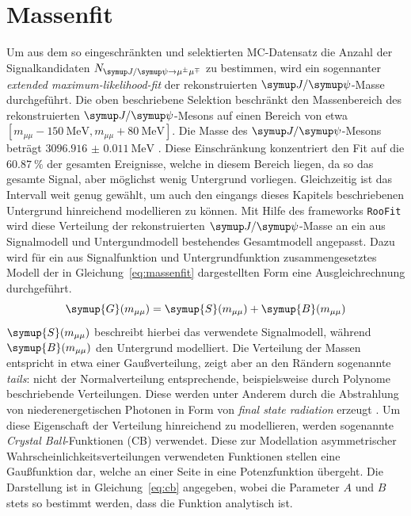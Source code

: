 \section{Massenfit}
Um aus dem so eingeschränkten und selektierten MC-Datensatz die Anzahl der Signalkandidaten $N_{\kontroll}$ zu bestimmen, wird ein sogennanter \textit{extended maximum-likelihood-fit} \cite{extended} der rekonstruierten $\jpsi$-Masse durchgeführt. Die oben
beschriebene Selektion beschränkt den Massenbereich des rekonstruierten $\jpsi$-Mesons auf einen Bereich von etwa
$[m_{\mu\mu}-\SI{150}{\mega\electronvolt}, m_{\mu\mu}+\SI{80}{\mega\electronvolt}]$. Die Masse des $\jpsi$-Mesons beträgt $\SI{3096.916(11)}{\mega\electronvolt}$ \cite{pdg}. Diese Einschränkung konzentriert den Fit auf die $\SI{60.87}{\percent}$ der gesamten Ereignisse, welche in diesem Bereich liegen, da so das gesamte Signal, aber möglichst wenig Untergrund vorliegen. Gleichzeitig ist das Intervall weit genug gewählt, um auch den eingangs dieses Kapitels beschriebenen Untergrund hinreichend modellieren zu können.
%
%
Mit Hilfe des frameworks \texttt{RooFit} \cite{roofit} wird diese Verteilung der rekonstruierten $\jpsi$-Masse an ein aus Signalmodell und Untergundmodell bestehendes Gesamtmodell angepasst. Dazu wird für ein aus Signalfunktion und Untergrundfunktion zusammengesetztes Modell der in Gleichung~\ref{eq:massenfit} dargestellten Form eine Ausgleichrechnung durchgeführt.
%
\begin{equation}
  \symup{G}(m_{\mu\mu})= \symup{S}(m_{\mu\mu}) + \symup{B}(m_{\mu\mu})
  \label{eq:massenfit}
\end{equation}
%
$\symup{S}(m_{\mu\mu})$ beschreibt hierbei das verwendete Signalmodell, während $\symup{B}(m_{\mu\mu})$ den Untergrund modelliert. Die Verteilung der Massen entspricht in etwa einer Gaußverteilung, zeigt aber an den Rändern sogenannte \textit{tails}: nicht der Normalverteilung entsprechende, beispielsweise durch Polynome beschriebende Verteilungen. Diese werden unter Anderem durch die Abstrahlung von niederenergetischen Photonen in Form von \textit{final state radiation} erzeugt \cite{cb}. Um diese Eigenschaft der Verteilung hinreichend zu modellieren, werden sogenannte \textit{Crystal Ball}-Funktionen (CB) verwendet. Diese zur Modellation asymmetrischer Wahrscheinlichkeitsverteilungen verwendeten Funktionen stellen eine Gaußfunktion dar, welche an einer Seite in eine Potenzfunktion übergeht. Die Darstellung ist in Gleichung~\ref{eq:cb} \cite{cb} angegeben, wobei die Parameter $A$ und $B$ stets so bestimmt werden, dass die Funktion analytisch ist.
